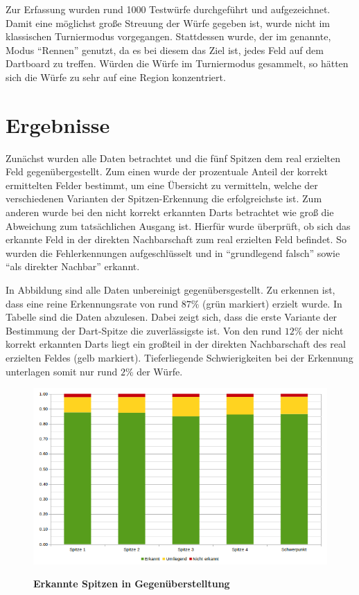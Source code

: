 Zur Erfassung wurden rund 1000  Testwürfe durchgeführt und aufgezeichnet. Damit eine möglichst große Streuung der Würfe gegeben ist, wurde nicht im klassischen Turniermodus vorgegangen. Stattdessen wurde, der im  genannte, Modus "`Rennen"' genutzt, da es bei diesem das Ziel ist, jedes Feld auf dem Dartboard zu treffen. Würden die Würfe im Turniermodus gesammelt, so hätten sich die Würfe zu sehr auf eine Region konzentriert.


\section*{Ergebnisse}
\label{sec:results}
Zunächst wurden alle Daten betrachtet und die fünf Spitzen dem real erzielten Feld gegenübergestellt. Zum einen wurde der prozentuale Anteil der korrekt ermittelten Felder bestimmt, um eine Übersicht zu vermitteln, welche der verschiedenen Varianten der Spitzen-Erkennung die erfolgreichste ist. Zum anderen wurde bei den nicht korrekt erkannten Darts betrachtet wie groß die Abweichung zum tatsächlichen Ausgang ist. Hierfür wurde überprüft, ob sich das erkannte Feld in der direkten Nachbarschaft zum real erzielten Feld befindet. So wurden die Fehlerkennungen aufgeschlüsselt und in "`grundlegend falsch"' sowie "`als direkter Nachbar"' erkannt.


In Abbildung   sind alle Daten unbereinigt gegenübersgestellt. Zu erkennen ist, dass eine reine Erkennungsrate von rund $87\%$ (grün markiert) erzielt wurde. In Tabelle  sind die Daten abzulesen. Dabei zeigt sich, dass die erste Variante der Bestimmung der Dart-Spitze die zuverlässigste ist. Von den rund $12\%$ der nicht korrekt erkannten Darts liegt ein großteil in der direkten Nachbarschaft des real erzielten Feldes (gelb markiert). Tieferliegende Schwierigkeiten bei der Erkennung unterlagen somit nur rund $2\%$ der Würfe.
\begin{figure}[ht]
\centering
\includegraphics[width=\textwidth]{media/chartplain}\\
\caption{\textbf{Erkannte Spitzen in Gegenüberstelltung}}
\label{Fig:plainchart}
\end{figure}

